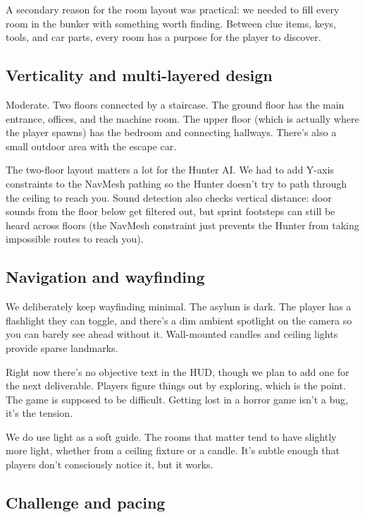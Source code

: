 \documentclass[12pt, a4paper]{article}
\begin{document}
A secondary reason for the room layout was practical: we needed to fill every room in the bunker with something worth finding. Between clue items, keys, tools, and car parts, every room has a purpose for the player to discover.

\subsection{Verticality and multi-layered design}

Moderate. Two floors connected by a staircase. The ground floor has the main entrance, offices, and the machine room. The upper floor (which is actually where the player spawns) has the bedroom and connecting hallways. There's also a small outdoor area with the escape car.

The two-floor layout matters a lot for the Hunter AI. We had to add Y-axis constraints to the NavMesh pathing so the Hunter doesn't try to path through the ceiling to reach you. Sound detection also checks vertical distance: door sounds from the floor below get filtered out, but sprint footsteps can still be heard across floors (the NavMesh constraint just prevents the Hunter from taking impossible routes to reach you).

\subsection{Navigation and wayfinding}

We deliberately keep wayfinding minimal. The asylum is dark. The player has a flashlight they can toggle, and there's a dim ambient spotlight on the camera so you can barely see ahead without it. Wall-mounted candles and ceiling lights provide sparse landmarks.

Right now there's no objective text in the HUD, though we plan to add one for the next deliverable. Players figure things out by exploring, which is the point. The game is supposed to be difficult. Getting lost in a horror game isn't a bug, it's the tension.

We do use light as a soft guide. The rooms that matter tend to have slightly more light, whether from a ceiling fixture or a candle. It's subtle enough that players don't consciously notice it, but it works.

\subsection{Challenge and pacing}
\end{document}
